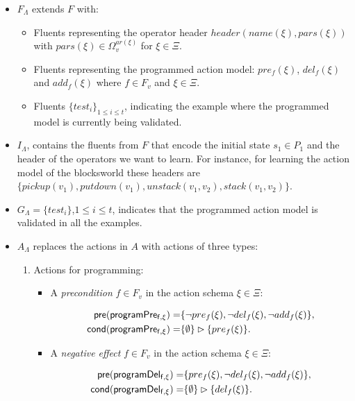 \documentclass[letterpaper]{article} %
\newcommand{\pre}{\mathsf{pre}}     %
\newcommand{\cond}{\mathsf{cond}}   %
\begin{document}
\begin{itemize}
\item $F_{\Lambda}$ extends $F$ with:
\begin{itemize}
\item Fluents representing the operator header $header(name(\xi),pars(\xi))$ with $pars(\xi)\in\Omega_v^{ar(\xi)}$ for $\xi \in \Xi$. 
\item Fluents representing the programmed action model: $pre_f(\xi)$, $del_f(\xi)$ and $add_f(\xi)$ where $f\in F_v$ and $\xi \in \Xi$.
\item Fluents $\{test_i\}_{1\leq i\leq t}$, indicating the example where the programmed model is currently being validated.
\end{itemize}
\item $I_{\Lambda}$, contains the fluents from $F$ that encode the initial state $s_1\in P_1$ and the header of the operators we want to learn. For instance, for learning the action model of the blocksworld these headers are {\small $\{pickup(v_1),putdown(v_1),unstack(v_1,v_2),stack(v_1,v_2)\}$}.
\item $G_{\Lambda}=\{test_i\}$,{\small $1\leq i\leq t$}, indicates that the programmed action model is validated in all the examples.
\item $A_{\Lambda}$ replaces the actions in $A$ with actions of three types:
\begin{enumerate}
\item Actions for programming:
\begin{itemize}
\item A {\em precondition} $f\in F_v$ in the action schema $\xi\in\Xi$:
\begin{small}
\begin{align*}
\hspace*{7pt}\pre(\mathsf{programPre_{f,\xi}})=&\{\neg pre_{f}(\xi),\neg del_{f}(\xi),\neg add_{f}(\xi)\},\\    
\cond(\mathsf{programPre_{f,\xi}})=&\{\emptyset\}\rhd\{pre_{f}(\xi)\}.
\end{align*}
\end{small}
\item A {\em negative effect} $f\in F_v$ in the action schema $\xi\in\Xi$:
\begin{small}
\begin{align*}
\hspace*{7pt}\pre(\mathsf{programDel_{f,\xi}})=&\{pre_{f}(\xi),\neg del_{f}(\xi),\neg add_{f}(\xi)\},\\                                                   
\cond(\mathsf{programDel_{f,\xi}})=&\{\emptyset\}\rhd\{del_{f}(\xi)\}.
\end{align*}
\end{small}


\end{itemize}
\end{enumerate}
\end{itemize}
\end{document}
